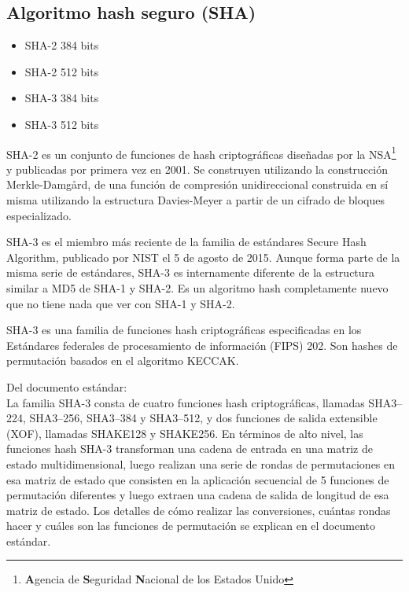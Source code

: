 \documentclass[../main.tex]{subfiles}
\begin{document}
\subsection{Algoritmo hash seguro (SHA)}\label{sec:algor-hash-seguro-1}

\begin{itemize}
  \item SHA-2 384 bits
  \item SHA-2 512 bits
  \item SHA-3 384 bits
  \item SHA-3 512 bits
\end{itemize}
SHA-2 es un conjunto de funciones de hash criptográficas diseñadas por
la NSA\footnote{\textbf{A}gencia de \textbf{S}eguridad \textbf{N}acional de los Estados Unido} y
publicadas por primera vez en 2001. Se construyen utilizando la construcción Merkle-Damgård, de
una función de compresión unidireccional construida en sí misma utilizando la estructura
Davies-Meyer a partir de un cifrado de bloques especializado.

SHA-3 es el miembro más reciente de la familia de estándares Secure
Hash Algorithm, publicado por NIST el 5 de agosto de 2015. Aunque forma parte de la
misma serie de estándares, SHA-3 es internamente diferente de la estructura similar a MD5 de
SHA-1 y SHA-2.  Es un algoritmo hash completamente nuevo que no tiene nada que ver con SHA-1 y SHA-2.

SHA-3 es una familia de funciones hash criptográficas especificadas en los Estándares federales
de procesamiento de información (FIPS) 202. Son hashes de permutación basados en el algoritmo KECCAK.\@

Del documento estándar:\\
La familia SHA-3 consta de cuatro funciones hash criptográficas, llamadas SHA3--224, SHA3--256,
SHA3--384 y SHA3--512, y dos funciones de salida extensible (XOF), llamadas SHAKE128 y SHAKE256.
En términos de alto nivel, las funciones hash SHA-3 transforman una cadena de entrada en una matriz
de estado multidimensional, luego realizan una serie de rondas de permutaciones en esa matriz de
estado que consisten en la aplicación secuencial de 5 funciones de permutación diferentes y luego
extraen una cadena de salida de longitud de esa matriz de estado. Los detalles de cómo realizar las
conversiones, cuántas rondas hacer y cuáles son las funciones de permutación se explican en el documento estándar.
\end{document}
